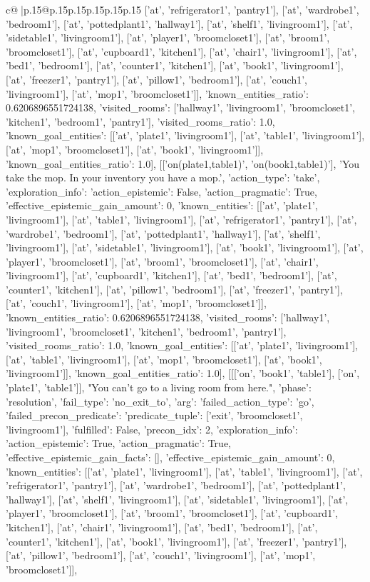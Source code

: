 \documentclass{article}
\begin{document}
{\begin{supertabular}{c@{$\;$}|p{.15\linewidth}@{}p{.15\linewidth}p{.15\linewidth}p{.15\linewidth}p{.15\linewidth}p{.15\linewidth}}
{{{['at', 'refrigerator1', 'pantry1'], ['at', 'wardrobe1', 'bedroom1'], ['at', 'pottedplant1', 'hallway1'], ['at', 'shelf1', 'livingroom1'], ['at', 'sidetable1', 'livingroom1'], ['at', 'player1', 'broomcloset1'], ['at', 'broom1', 'broomcloset1'], ['at', 'cupboard1', 'kitchen1'], ['at', 'chair1', 'livingroom1'], ['at', 'bed1', 'bedroom1'], ['at', 'counter1', 'kitchen1'], ['at', 'book1', 'livingroom1'], ['at', 'freezer1', 'pantry1'], ['at', 'pillow1', 'bedroom1'], ['at', 'couch1', 'livingroom1'], ['at', 'mop1', 'broomcloset1']], 'known_entities_ratio': 0.6206896551724138, 'visited_rooms': ['hallway1', 'livingroom1', 'broomcloset1', 'kitchen1', 'bedroom1', 'pantry1'], 'visited_rooms_ratio': 1.0, 'known_goal_entities': [['at', 'plate1', 'livingroom1'], ['at', 'table1', 'livingroom1'], ['at', 'mop1', 'broomcloset1'], ['at', 'book1', 'livingroom1']], 'known_goal_entities_ratio': 1.0}}], [['on(plate1,table1)', 'on(book1,table1)'], 'You take the mop. In your inventory you have a mop.', {'action_type': 'take', 'exploration_info': {'action_epistemic': False, 'action_pragmatic': True, 'effective_epistemic_gain_amount': 0, 'known_entities': [['at', 'plate1', 'livingroom1'], ['at', 'table1', 'livingroom1'], ['at', 'refrigerator1', 'pantry1'], ['at', 'wardrobe1', 'bedroom1'], ['at', 'pottedplant1', 'hallway1'], ['at', 'shelf1', 'livingroom1'], ['at', 'sidetable1', 'livingroom1'], ['at', 'book1', 'livingroom1'], ['at', 'player1', 'broomcloset1'], ['at', 'broom1', 'broomcloset1'], ['at', 'chair1', 'livingroom1'], ['at', 'cupboard1', 'kitchen1'], ['at', 'bed1', 'bedroom1'], ['at', 'counter1', 'kitchen1'], ['at', 'pillow1', 'bedroom1'], ['at', 'freezer1', 'pantry1'], ['at', 'couch1', 'livingroom1'], ['at', 'mop1', 'broomcloset1']], 'known_entities_ratio': 0.6206896551724138, 'visited_rooms': ['hallway1', 'livingroom1', 'broomcloset1', 'kitchen1', 'bedroom1', 'pantry1'], 'visited_rooms_ratio': 1.0, 'known_goal_entities': [['at', 'plate1', 'livingroom1'], ['at', 'table1', 'livingroom1'], ['at', 'mop1', 'broomcloset1'], ['at', 'book1', 'livingroom1']], 'known_goal_entities_ratio': 1.0}}], [[['on', 'book1', 'table1'], ['on', 'plate1', 'table1']], "You can't go to a living room from here.", {'phase': 'resolution', 'fail_type': 'no_exit_to', 'arg': {'failed_action_type': 'go', 'failed_precon_predicate': {'predicate_tuple': ['exit', 'broomcloset1', 'livingroom1'], 'fulfilled': False, 'precon_idx': 2}}, 'exploration_info': {'action_epistemic': True, 'action_pragmatic': True, 'effective_epistemic_gain_facts': [], 'effective_epistemic_gain_amount': 0, 'known_entities': [['at', 'plate1', 'livingroom1'], ['at', 'table1', 'livingroom1'], ['at', 'refrigerator1', 'pantry1'], ['at', 'wardrobe1', 'bedroom1'], ['at', 'pottedplant1', 'hallway1'], ['at', 'shelf1', 'livingroom1'], ['at', 'sidetable1', 'livingroom1'], ['at', 'player1', 'broomcloset1'], ['at', 'broom1', 'broomcloset1'], ['at', 'cupboard1', 'kitchen1'], ['at', 'chair1', 'livingroom1'], ['at', 'bed1', 'bedroom1'], ['at', 'counter1', 'kitchen1'], ['at', 'book1', 'livingroom1'], ['at', 'freezer1', 'pantry1'], ['at', 'pillow1', 'bedroom1'], ['at', 'couch1', 'livingroom1'], ['at', 'mop1', 'broomcloset1']], }}}
\end{supertabular}}
\end{document}
